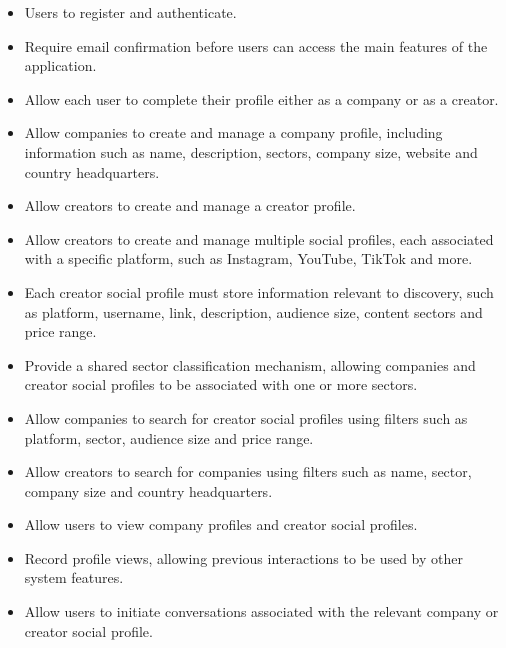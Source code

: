 \begin{itemize}
    \item Users to register and authenticate.

    \item Require email confirmation before users can access the main features of the application.

    \item Allow each user to complete their profile either as a company or as a creator.
    
    \item Allow companies to create and manage a company profile, including information such as name, description, sectors, company size, website and country headquarters.
    
    \item Allow creators to create and manage a creator profile.

    \item Allow creators to create and manage multiple social profiles, each associated with a specific platform, such as Instagram, YouTube, TikTok and more.
    
    \item Each creator social profile must store information relevant to discovery, such as platform, username, link, description, audience size, content sectors and price range.
    
    \item Provide a shared sector classification mechanism, allowing companies and creator social profiles to be associated with one or more sectors.
    
    \item Allow companies to search for creator social profiles using filters such as platform, sector, audience size and price range.

    \item Allow creators to search for companies using filters such as name, sector, company size and country headquarters.

    \item Allow users to view company profiles and creator social profiles.
    
    \item Record profile views, allowing previous interactions to be used by other system features.
    
    \item Allow users to initiate conversations associated with the relevant company or creator social profile.
    

\end{itemize}
